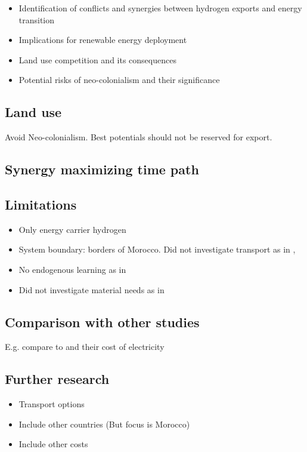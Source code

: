 \begin{itemize}
    \item Identification of conflicts and synergies between hydrogen exports and energy transition
    \item Implications for renewable energy deployment
    \item Land use competition and its consequences
    \item Potential risks of neo-colonialism and their significance
\end{itemize}


\subsection{Land use}
Avoid Neo-colonialism. Best potentials should not be reserved for export.

\subsection{Synergy maximizing time path}

\subsection{Limitations}
\label{subsec:limitations}
\begin{itemize}
    \item Only energy carrier hydrogen
    \item System boundary: borders of Morocco. Did not investigate transport as in \cite{Hampp2021}, \cite{Galimova2023}
    \item No endogenous learning as in \cite{Zeyen2023}
    \item Did not investigate material needs as in \cite{Wang2023}
\end{itemize}

\subsection{Comparison with other studies}
E.g. compare to \cite{Hampp2021} and their cost of electricity

\subsection{Further research}
\begin{itemize}
    \item Transport options
    \item Include other countries (But focus is Morocco)
    \item Include other costs
\end{itemize}
